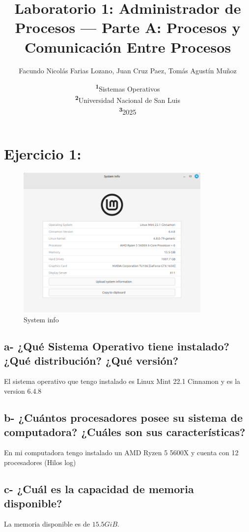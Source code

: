 \documentclass{article}
\title{\textbf{Laboratorio 1: }Administrador de Procesos --- Parte A\@: Procesos y Comunicación Entre Procesos}
\author{
Facundo Nicolás Farias Lozano,
Juan Cruz Paez,
Tomás Agustín Muñoz
}
\date{\footnotesize\textsuperscript{\textbf{1}}Sistemas Operativos\\ \textsuperscript{\textbf{2}}Universidad Nacional de San Luis\\ \textsuperscript{\textbf{3}}2025}
\begin{document}
\maketitle


\section*{Ejercicio 1:}

\begin{figure}[h]
  \centering
  \includegraphics[width=0.85\textwidth]{resources/ej1a.png}
  \caption{System info}
\end{figure}

\subsection*{a- ¿Qué Sistema Operativo tiene instalado? ¿Qué distribución? ¿Qué versión?}
\noindent
El sistema operativo que tengo instalado es Linux Mint 22.1 Cinnamon y es la version 6.4.8

\subsection*{b- ¿Cuántos procesadores posee su sistema de computadora? ¿Cuáles son sus características?}
\noindent
En mi computadora tengo instalado un AMD Ryzen 5 5600X y cuenta con 12 procesadores (Hilos log)

\subsection*{c- ¿Cuál es la capacidad de memoria disponible?}
\noindent
La memoria disponible es de \(15.5 GiB\).
\end{document}
